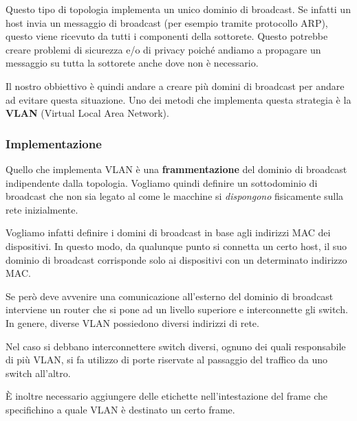 Questo tipo di topologia implementa un unico dominio di broadcast. Se
infatti un host invia un messaggio di broadcast (per esempio tramite 
protocollo ARP), questo viene ricevuto da tutti i componenti della 
sottorete. Questo potrebbe creare problemi di sicurezza e/o di privacy
poiché andiamo a propagare un messaggio su tutta la sottorete anche 
dove non è necessario.

Il nostro obbiettivo è quindi andare a creare più domini di broadcast
per andare ad evitare questa situazione. Uno dei metodi che implementa
questa strategia è la \textbf{VLAN} (Virtual Local Area Network).

\subsubsection{Implementazione}
Quello che implementa VLAN è una \textbf{frammentazione} del dominio di
broadcast indipendente dalla topologia. Vogliamo quindi definire un
sottodominio di broadcast che non sia legato al come le macchine si
\emph{dispongono} fisicamente sulla rete inizialmente.

Vogliamo infatti definire i domini di broadcast in base agli indirizzi
MAC dei dispositivi. In questo modo, da qualunque punto si connetta un
certo host, il suo dominio di broadcast corrisponde solo ai dispositivi
con un determinato indirizzo MAC.

Se però deve avvenire una comunicazione all'esterno del dominio di
broadcast interviene un router che si pone ad un livello superiore e
interconnette gli switch. In genere, diverse VLAN possiedono diversi
indirizzi di rete.

Nel caso si debbano interconnettere switch diversi, ognuno dei quali
responsabile di più VLAN, si fa utilizzo di porte riservate al
passaggio del traffico da uno switch all'altro.

\`E inoltre necessario aggiungere delle etichette nell'intestazione del
frame che specifichino a quale VLAN è destinato un certo frame.
